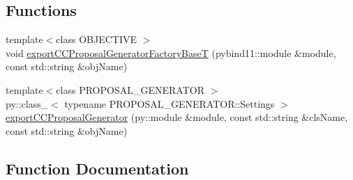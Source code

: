 \subsection*{Functions}
\begin{DoxyCompactItemize}
\item 
{\footnotesize template$<$class O\+B\+J\+E\+C\+T\+I\+V\+E $>$ }\\void \hyperlink{namespacenifty_1_1graph_1_1optimization_1_1common_a78d8d2a3a62c60cc2117005e75609134}{export\+C\+C\+Proposal\+Generator\+Factory\+Base\+T} (pybind11\+::module \&module, const std\+::string \&obj\+Name)
\item 
{\footnotesize template$<$class P\+R\+O\+P\+O\+S\+A\+L\+\_\+\+G\+E\+N\+E\+R\+A\+T\+O\+R $>$ }\\py\+::class\+\_\+$<$ typename P\+R\+O\+P\+O\+S\+A\+L\+\_\+\+G\+E\+N\+E\+R\+A\+T\+O\+R\+::\+Settings $>$ \hyperlink{namespacenifty_1_1graph_1_1optimization_1_1common_aa6e39a28f5413a1dee4423fcc677b5b8}{export\+C\+C\+Proposal\+Generator} (py\+::module \&module, const std\+::string \&cls\+Name, const std\+::string \&obj\+Name)
\end{DoxyCompactItemize}


\subsection{Function Documentation}
\hypertarget{namespacenifty_1_1graph_1_1optimization_1_1common_aa6e39a28f5413a1dee4423fcc677b5b8}{}
